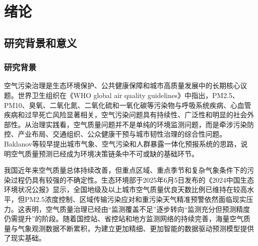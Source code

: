 %

    
\chapter{绪论}\label{ch:1}


\section{研究背景和意义}

\subsection{研究背景}

空气污染治理是生态环境保护、公共健康保障和城市高质量发展中的长期核心议题。世界卫生组织在《WHO global air quality guidelines》中指出，PM2.5、PM10、臭氧、二氧化氮、二氧化硫和一氧化碳等污染物与呼吸系统疾病、心血管疾病和过早死亡风险显著相关，空气污染问题具有持续性、广泛性和明显的社会外部性\cite{world_health_organization_who_2021,atkinson_urban_2010}。从治理实践看，空气质量问题并不是单纯的环境监测问题，而是牵涉污染防控、产业布局、交通组织、公众健康干预与城市韧性治理的综合性问题。Baklanov等较早提出城市气象、空气污染和人群暴露一体化预报系统的思路，说明空气质量预测已经成为环境决策链条中不可或缺的基础环节\cite{baklanov_integrated_2007}。

我国近年来空气质量总体持续改善，但重点区域、重点季节和复杂气象条件下的污染过程仍具有较强的不确定性。生态环境部于2025年6月5日发布的《2024中国生态环境状况公报》显示，全国地级及以上城市空气质量优良天数比例已维持在较高水平，但PM2.5浓度控制、区域传输污染应对和重污染天气精准预警依然面临现实压力\cite{_2024_2025}。这表明，空气质量治理已经由“监测覆盖不足”逐步转向“监测充分但预测精度仍需提升”的阶段。随着国控站、省控站和地方监测网络的持续完善，海量空气质量与气象观测数据不断累积，为建立更加精细、更加智能的数据驱动预测模型提供了现实基础。

